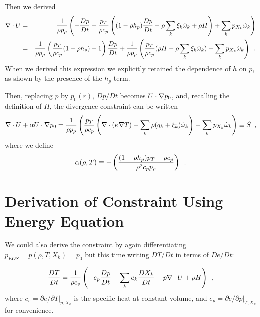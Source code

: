 Then we derived
\begin{eqnarray*}
\nabla \cdot U &=& \frac{1}{\rho p_\rho} \left(
- \frac{D p}{D t} + \frac{p_T}{\rho c_p}
  \left( (1 - \rho h_p) \frac{D p}{D t} - \rho \sum_k \xi_k \dot{\omega}_k + \rho H \right)
+ \sum_k p_{X_k} \dot{\omega}_k \right)  \\
                 &=& \frac{1}{\rho p_\rho}
  \left( \frac{p_T}{\rho c_p}(1  - \rho h_p) - 1 \right) \frac{D p}{D t}
 + \frac{1}{\rho p_\rho} \left(
  \frac{p_T}{\rho c_p} (\rho H - \rho \sum_k \xi_k   \dot{\omega}_k)
                               + \sum_k p_{X_k} \dot{\omega}_k \right) \enskip .
\end{eqnarray*}
When we derived this expression we explicitly retained the dependence of $h$ on $p$,
as shown by the presence of the $h_p$ term.   

Then, replacing $p$ by $p_0(r)$, $Dp/Dt$ becomes $U \cdot
\nabla p_0$, and, recalling the definition of $H$, the divergence constraint can
be written
\begin{equation}
\nabla \cdot U + \alpha U \cdot \nabla p_0 =
\frac{1}{\rho p_\rho} \left(
   \frac{p_T}{\rho c_p} \left(\nabla \cdot (\kappa \nabla T)
  - \sum_k\rho (q_k + \xi_k) \dot{\omega}_k \right)
 + \sum_k p_{X_k} \dot{\omega}_k \right)  \equiv \tilde{S} \enskip \label{eq:full_divu_constraint} ,
\end{equation}
where we define
\begin{equation}
\alpha(\rho,T) \equiv - \left( \frac{(1 - \rho h_p )p_T - \rho c_p}{\rho^2
  c_p p_\rho} \right) \enskip . \label{eq:alphadef}
\end{equation}

\section{Derivation of Constraint Using Energy Equation}

We could also derive the constraint by again differentiating $p_{EOS} = p(\rho,T,X_k) = p_0$
but this time writing $DT/Dt$ in terms of $De/Dt:$

\begin{equation}
\frac{DT}{Dt} = \frac{1}{\rho c_v} \left( -e_p \frac{D p}{D t}
- \sum_k e_k \frac{D X_k}{D t} - p \nabla \cdot U 
+ \rho H \right) \enskip , \label{eq:dTdt}
\end{equation}
where $c_v = \left.\partial e/\partial T\right|_{p,X_k}$ is the
specific heat at constant volume,
and $e_p = \left.\partial e/\partial p\right|_{T,X_k}$
for convenience.

